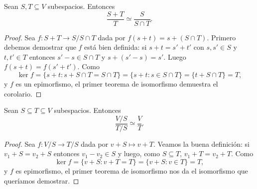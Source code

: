 \begin{cor}
    Sean $S,T\subseteq V$ subespacios. Entonces 
    \[
    \frac{S+T}{T}\simeq \frac{S}{S\cap T}.
    \]

    \begin{proof}
        Sea $f\colon S+T\to S/S\cap T$ dada por $f(s+t)=s+(S\cap T)$. Primero
        debemos demostrar que $f$ está bien definida: si $s+t=s'+t'$ con
        $s,s'\in S$ y $t,t'\in T$ entonces $s'-s\in S\cap T$ y $s+(s'-s)=s'$.
        Luego $f(s+t)=f(s'+t')$. Como
        \[
            \ker f=\{s+t: s+S\cap T=S\cap T\}=\{s+t:s\in S\cap T\}=\{t+S\cap T\}=T,
        \]
        y $f$ es un epimorfismo, el primer teorema de isomorfismo demuestra el
        corolario.
    \end{proof}
\end{cor}

\begin{cor}
    Sean $S\subseteq T\subseteq V$ subespacios. Entonces
    \[
        \frac{V/S}{T/S}\simeq \frac{V}{T}.
    \]

    \begin{proof}
        Sea $f\colon V/S\to T/S$ dada por $v+S\mapsto v+T$. Veamos la buena
        definición: si $v_1+S=v_2+S$ entonces $v_1-v_2\in S$ y luego, como
        $S\subseteq T$, $v_1+T=v_2+T$. Como
        \[
            \ker f=\{v+S:v+T=T\}=\{v+S:v\in T\}=T,
        \]
        y $f$ es epimorfismo, el primer teorema de isomorfismo nos da el
        isomorfismo que queríamos demostrar.
    \end{proof}
\end{cor}
